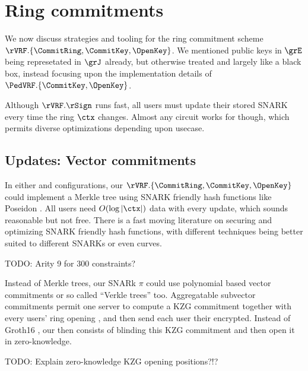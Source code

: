 \section{Ring commitments}

We now discuss strategies and tooling for the ring commitment scheme
$\rVRF.\{ \CommitRing, \CommitKey, \OpenKey \}$.
We mentioned public keys in $\grE$ being represetated in $\grJ$ already,
but otherwise treated \pifast and \pisafe largely like a black box,
instead focusing upon the implementation details of 
 $\PedVRF.\{ \CommitKey, \OpenKey \}$.


Although $\rVRF.\rSign$ runs fast, all users must update their stored
SNARK \pifast every time the ring $\ctx$ changes.
Almost any circuit works for \pifast though,
 which permits diverse optimizations depending upon usecase.

\subsection{Updates: Vector commitments}

In either \pifast and \pisafe configurations, 
our $\rVRF.\{ \CommitRing, \CommitKey, \OpenKey \}$ could implement a
Merkle tree using SNARK friendly hash functions like Poseidon \cite{poseidon}.
%
All users need $O(\log |\ctx|)$ data with every update, which sounds
reasonable but not free.  There is a fast moving literature on securing
and optimizing SNARK friendly hash functions, with different techniques
being better suited to different SNARKs or even curves.

TODO: Arity 9 for 300 constraints?   %

Instead of Merkle trees, our SNARk $\pi$ could use polynomial based
vector commitments \cite{KZG} or so called ``Verkle trees'' \cite{??Verkle??} too.
%
Aggregatable subvector commitments \cite{aSVC} permit one server to
compute a KZG commitment \comring together with every users' ring opening
\openring,  and then send each user their \openring encrypted.
Instead of Groth16 \cite{groth16}, our \pisafe then consists
of blinding this KZG commitment and then open it in zero-knowledge.

TODO: Explain zero-knowledge KZG opening positions?!?

